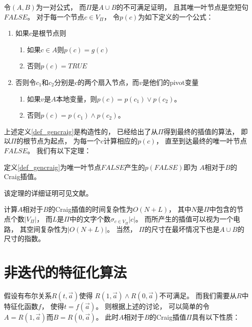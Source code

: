 \begin{definition}\label{def_gencraig}
令$(A,B)$为一对公式，
而$\Pi$是$A\cup B$的不可满足证明，
且其唯一叶节点是空短句$FALSE$。
对于每一个节点$c\in V_{\Pi}$，
令$p(c)$为如下定义的一个公式：
\begin{enumerate}
\item 如果$c$是根节点则
  \begin{enumerate}
    \item 如果$c\in A$则$p(c)=g(c)$
    \item 否则$p(c)=TRUE$
  \end{enumerate}
\item 否则令$c_1$和$c_2$分别是$c$的两个扇入节点，而$v$是他们的pivot变量
  \begin{enumerate}
    \item 如果$v$是$A$本地变量，则$p(c)=p(c_1)\vee p(c_2)$。
    \item 否则$p(c)=p(c_1)\wedge p(c_2)$。
  \end{enumerate}
\end{enumerate}
\end{definition}

上述定义\ref{def_gencraig}是构造性的，
已经给出了从$\Pi$得到最终的插值的算法，
即以$\Pi$的根节点为起点，
为每一个$c$计算相应的$p(c)$，
直至到达最终的唯一叶节点$FALSE$。
我们有以下定理：

\begin{theorem}
定义\ref{def_gencraig}为唯一叶节点$FALSE$产生的$p(FALSE)$即为
$A$相对于$B$的Craig插值。
\end{theorem}

该定理的详细证明可见文献。

计算$A$相对于$B$的Craig插值的时间复杂性为$O(N+L)$，
其中$N$是$\Pi$中包含的节点个数$|V_{\Pi}|$，
而$L$是$\Pi$中的文字个数$\sigma_{c\in V_{\Pi}}|c|$。
而所产生的插值可以视为一个电路，
其空间复杂性为$|O(N+L)|$。
当然，
$\Pi$的尺寸在最坏情况下也是$A\cup B$的尺寸的指数。



\section{非迭代的特征化算法}\label{sec_craigchar}

假设有布尔关系$R(t,\vec{a})$使得
$R(1,\vec{a})\wedge R(0,\vec{a})$不可满足。
而我们需要从$R$中特征化函数$f$，
使得$t=f(\vec{a})$。
则根据上述的讨论，
可以简单的令$A=R(1,\vec{a})$而$B=R(0,\vec{a})$。
此时$A$相对于$B$的Craig插值$\Pi$具有以下性质：

